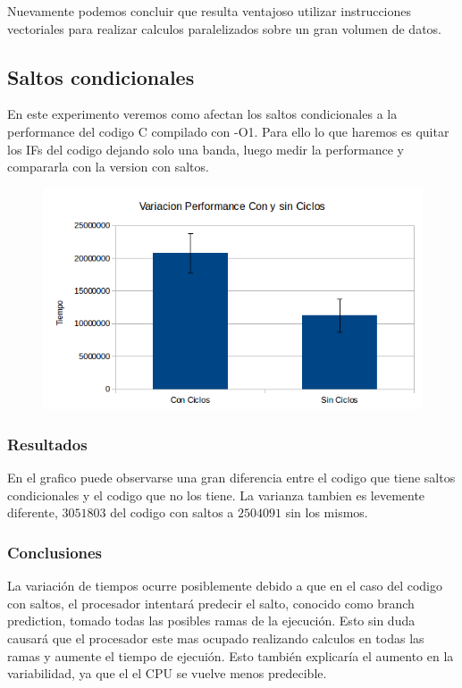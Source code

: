 \documentclass[a4paper]{article}
\begin{document}
Nuevamente podemos concluir que resulta ventajoso utilizar instrucciones vectoriales para realizar calculos paralelizados sobre un gran volumen de datos.

\newpage
\subsection{Saltos condicionales}

En este experimento veremos como afectan los saltos condicionales a la performance del codigo C compilado con -O1. Para ello lo que haremos es quitar los IFs del codigo dejando solo una banda, luego medir la performance y compararla con la version con saltos.

\begin{figure}[h!]
  \begin{center}
  \includegraphics[scale=0.66]{Graficos3.1/per.png}
  \label{nombreparareferenciar1}
  \end{center}
\end{figure}

\subsubsection{Resultados}
En el grafico puede observarse una gran diferencia entre el codigo que tiene saltos condicionales y el codigo que no los tiene. La varianza tambien es levemente diferente, $3051803$ del codigo con saltos a $2504091$ sin los mismos.

\subsubsection{Conclusiones}

La variación de tiempos ocurre posiblemente debido a que en el caso del codigo con saltos, el procesador intentará predecir el salto, conocido como branch prediction, tomado todas las posibles ramas de la ejecución. Esto sin duda causará que el procesador este mas ocupado realizando calculos en todas las ramas y aumente el tiempo de ejecuión. Esto también explicaría el aumento en la variabilidad, ya que el el CPU se vuelve menos predecible.
\end{document}
